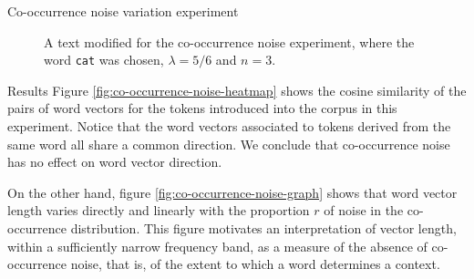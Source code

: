 \documentclass{article} %
\newcommand{\word}[1]{\texttt{#1}}
\begin{document}
\begin{section}{Co-occurrence noise variation experiment}
\begin{table}\label{cooccurrence-noise-words}
	
	\label{fig:co-occurrence-noise-counts}
	\caption{Occurrence counts for words chosen for the co-occurrence noise experiment. }
\end{table}

\begin{figure}
	\begin{mdframed}
	
	\end{mdframed}
	\caption{A text modified for the co-occurrence noise experiment, where the word \word{cat} was chosen, $\lambda = 5/6$ and $n=3$.}
\label{fig:co-occurrence-noise-experiment-text}
\end{figure}

\begin{subsection}{Results}
Figure \ref{fig:co-occurrence-noise-heatmap} shows the cosine similarity of the pairs of word vectors for the tokens introduced into the corpus in this experiment.
Notice that the word vectors associated to tokens derived from the same word all share a common direction.
We conclude that co-occurrence noise has no effect on word vector direction.

On the other hand, figure \ref{fig:co-occurrence-noise-graph} shows that word vector length varies directly and linearly with the proportion $r$ of noise in the co-occurrence distribution.
This figure motivates an interpretation of vector length, within a sufficiently narrow frequency band, as a measure of the absence of co-occurrence noise, that is, of the extent to which a word determines a context.



\end{subsection}
\end{section}
\end{document}
